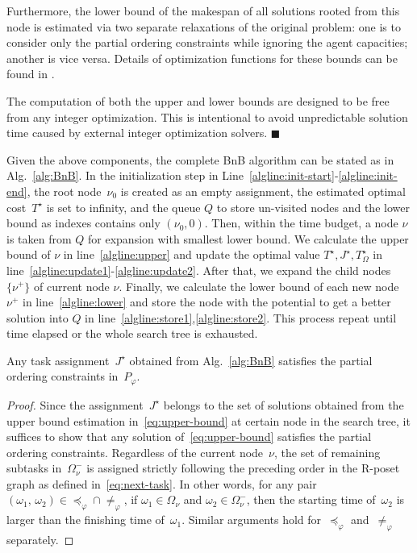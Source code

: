 Furthermore, the lower bound of the makespan of all solutions rooted from this
node is estimated via two separate relaxations of the original problem:
one is to consider only the partial ordering constraints while ignoring
the agent capacities;
another is vice versa. Details of optimization functions for these bounds
can be found in \citep{liu2022arxiv}.




\begin{remark}\label{remark:none-milp}
The computation of both the upper and lower bounds are designed
to be free from any integer optimization.
This is intentional to avoid unpredictable solution time caused by
external integer optimization solvers.
\hfill $\blacksquare$
\end{remark}

Given the above components, the complete BnB algorithm can be stated as
in Alg.~\ref{alg:BnB}.
In the initialization step in
Line~\ref{algline:init-start}-\ref{algline:init-end},
the root node~$\nu_0$ is created as an empty assignment,
the estimated optimal cost~$T^{\star}$ is set to infinity,
and the queue $Q$ to store un-visited nodes and the lower bound as indexes contains only $(\nu_0,0)$.
Then, within the time budget, a node $\nu$ is taken from $Q$ for expansion with smallest lower bound.
We calculate the upper bound of $\nu$ in line~\ref{algline:upper} and update the optimal value $T^\star,J^\star,T^\star_\Omega$
in line~\ref{algline:update1}-\ref{algline:update2}.
After that, we expand the child nodes $\{\nu^+\}$ of current node $\nu$.
Finally, we calculate the lower bound of each new node $\nu^+$ in line~\ref{algline:lower} and store
the node with the potential to get a better solution into $Q$ in line~\ref{algline:store1},\ref{algline:store2}.
This process repeat until time elapsed or the whole search tree is
exhausted.

\begin{lemma}\label{lemma:BnB-satisfying}
Any task assignment~$J^\star$ obtained from Alg.~\ref{alg:BnB} satisfies
the partial ordering constraints in~$P_{\varphi}$.
\end{lemma}
\begin{proof}
Since the assignment~$J^\star$ belongs to the set of solutions obtained from
the upper bound estimation in~\eqref{eq:upper-bound}
at certain node in the search tree, it suffices to show that any solution
of~\eqref{eq:upper-bound} satisfies the partial ordering constraints.
Regardless of the current node~$\nu$, the set of remaining subtasks
in~$\Omega^-_\nu$ is assigned strictly following the preceding order
in the R-poset graph as defined in~\eqref{eq:next-task}.
In other words, for any pair~$(\omega_1,\,\omega_2)\in \preceq_{\varphi}\cap \neq_{\varphi}$,
if $\omega_1\in \Omega_\nu$ and $\omega_2\in \Omega^-_\nu$,
then the starting time of~$\omega_2$ is larger than the finishing time of~$\omega_1$.
Similar arguments hold for~$\preceq_{\varphi}$ and~$\neq_{\varphi}$ separately.
\end{proof}
